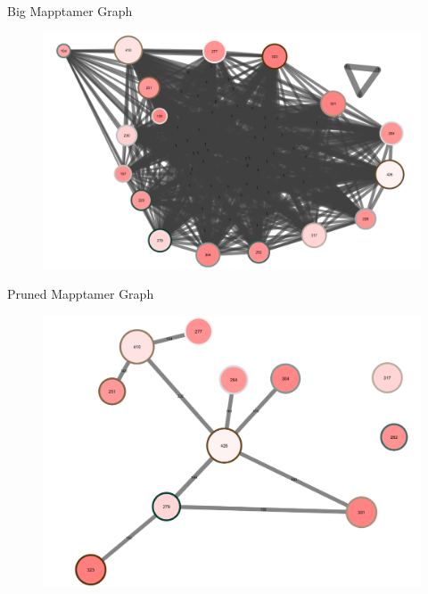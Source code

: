 \documentclass{beamer}
\begin{document}
\begin{frame}{Big Mapptamer Graph}
  \begin{figure}
    \begin{center}
      \includegraphics[width=1\textwidth]{bigmapptamer.png}
    \end{center}
  \end{figure}
\end{frame}

\begin{frame}{Pruned Mapptamer Graph}
  \begin{figure}
    \begin{center}
      \includegraphics[width=1\textwidth]{prunedmapptamer.png}
    \end{center}
  \end{figure}
\end{frame}
\end{document}
